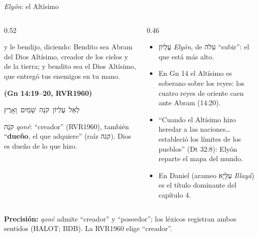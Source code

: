 \documentclass[hyperref={bookmarks=false},aspectratio=169]{beamer}
\newcommand{\heb}[1]{\mbox{\foreignlanguage{hebrew}{#1}}}
\newcommand{\fuente}[1]{\par\hfill{\upshape\bfseries\footnotesize\textcolor{azul}{#1}}}
\newcommand{\destacar}[1]{\textbf{\textcolor{azul}{#1}}}
\newcommand{\precision}[1]{{\footnotesize\color{gris}\textbf{Precisión:} #1}}
\begin{document}
\begin{frame}{\emph{Elyón}: el Altísimo}
\begin{columns}[t,onlytextwidth]
\begin{column}{0.52\textwidth}
\begin{cita}y le bendijo, diciendo: Bendito sea Abram del Dios Altísimo, creador de los cielos y de la tierra; y bendito sea el Dios Altísimo, que entregó tus enemigos en tu mano.\fuente{(Gn 14:19--20, RVR1960)}\end{cita}
\begin{center}\heb{לְאֵל עֶלְיוֹן קֹנֵה שָׁמַיִם וָאָרֶץ}\end{center}
\scriptsize \heb{קֹנֵה} \emph{qoné}: ``creador'' (RVR1960), también ``\destacar{dueño}, el que adquiere'' (raíz \heb{קנה}). Dios es dueño de lo que hizo.
\end{column}
\begin{column}{0.46\textwidth}\small
\begin{itemize}
\item \heb{עֶלְיוֹן} \emph{Elyón}, de \heb{עלה} ``subir'': el que está más alto.
\item En Gn 14 el Altísimo es soberano sobre los reyes: los cuatro reyes de oriente caen ante Abram (14:20).
\item ``Cuando el Altísimo hizo heredar a las naciones\ldots{} estableció los límites de los pueblos'' (Dt 32:8): Elyón reparte el mapa del mundo.
\item En Daniel (arameo \heb{עִלָּיָא} \emph{Illayá}) es el título dominante del capítulo 4.
\end{itemize}
\end{column}
\end{columns}\par\smallskip
\precision{\emph{qoné} admite ``creador'' y ``poseedor''; los léxicos registran ambos sentidos (HALOT; BDB). La RVR1960 elige ``creador''.}
\end{frame}
\end{document}
